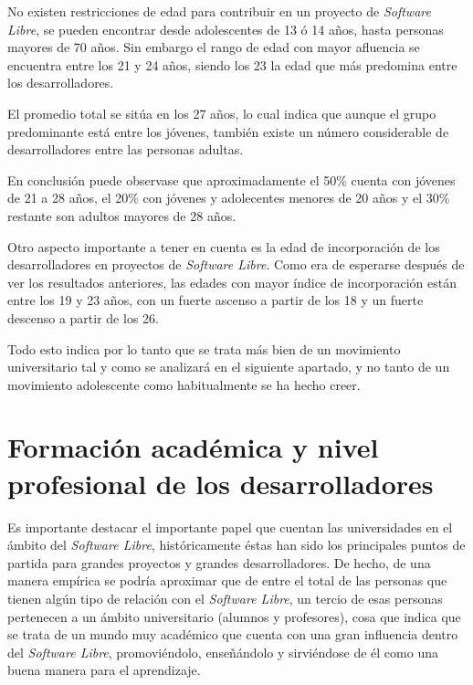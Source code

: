 No existen restricciones de edad para contribuir en un proyecto de \textit{Software Libre}, se pueden encontrar desde adolescentes de 13 ó 14 años, hasta personas mayores de 70 años. Sin embargo el rango de edad con mayor afluencia se encuentra entre los 21 y 24 años, siendo los 23 la edad que más predomina entre los desarrolladores. 

El promedio total se sitúa en los 27 años, lo cual indica que aunque el grupo predominante está entre los jóvenes, también existe un número considerable de desarrolladores entre las personas adultas. 

En conclusión puede observase que aproximadamente el 50\% cuenta con jóvenes de 21 a 28 años, el 20\% con jóvenes y adolecentes menores de 20 años y el 30\% restante son adultos mayores de 28 años.

Otro aspecto importante a tener en cuenta es la edad de incorporación de los desarrolladores en proyectos de \textit{Software Libre}. Como era de esperarse después de ver los resultados anteriores, las edades con mayor índice de incorporación están entre los 19 y 23 años, con un fuerte  ascenso a partir de  los 18 y un fuerte descenso a partir de los 26.

Todo esto indica por lo tanto que se trata más bien de un movimiento universitario tal y como se analizará en el siguiente apartado, y no tanto de un movimiento adolescente como habitualmente se ha hecho creer.

\section{Formación académica y nivel profesional de los desarrolladores}

Es importante destacar el importante papel que cuentan las universidades en el ámbito del \textit{Software Libre}, históricamente éstas han sido los principales puntos de partida para grandes proyectos y grandes desarrolladores. De hecho, de una manera empírica se podría aproximar que de entre el total de las personas que tienen algún tipo de relación con el \textit{Software Libre}, un tercio de esas personas pertenecen a un ámbito universitario (alumnos y profesores), cosa que indica que se trata de un mundo muy académico que cuenta con una gran influencia dentro del \textit{Software Libre}, promoviéndolo, enseñándolo y sirviéndose de él como una buena manera para el aprendizaje.

